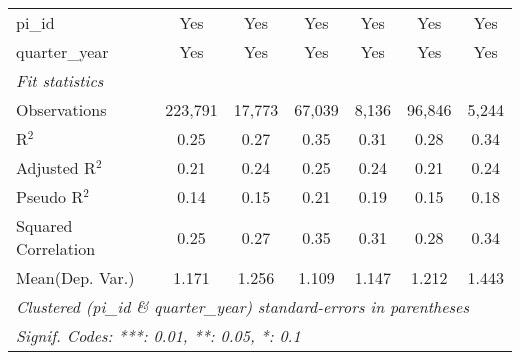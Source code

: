 \begin{tabular}{lcccccc}
   pi\_id                                                     & Yes            & Yes           & Yes           & Yes          & Yes           & Yes\\  
   quarter\_year                                              & Yes            & Yes           & Yes           & Yes          & Yes           & Yes\\  
   \midrule
   \emph{Fit statistics}\\
   Observations                                               & 223,791        & 17,773        & 67,039        & 8,136        & 96,846        & 5,244\\  
   R$^2$                                                      & 0.25           & 0.27          & 0.35          & 0.31         & 0.28          & 0.34\\  
   Adjusted R$^2$                                             & 0.21           & 0.24          & 0.25          & 0.24         & 0.21          & 0.24\\  
   Pseudo R$^2$                                               & 0.14           & 0.15          & 0.21          & 0.19         & 0.15          & 0.18\\  
   Squared Correlation                                        & 0.25           & 0.27          & 0.35          & 0.31         & 0.28          & 0.34\\  
Mean(Dep. Var.) & 1.171 & 1.256 & 1.109 & 1.147 & 1.212 & 1.443 \\
   \midrule \midrule
   \multicolumn{7}{l}{\emph{Clustered (pi\_id \& quarter\_year) standard-errors in parentheses}}\\
   \multicolumn{7}{l}{\emph{Signif. Codes: ***: 0.01, **: 0.05, *: 0.1}}\\
\end{tabular}
\par\endgroup
